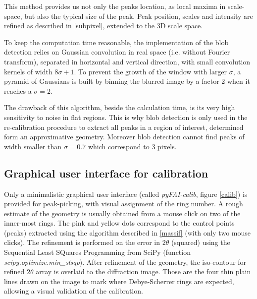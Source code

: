 \documentclass[preprint]{iucr}
\begin{document}
This method provides us not only the peaks location, as local maxima in
scale-space, but also the typical size of the peak.
Peak position, scales and intensity are refined as described in
\ref{subpixel}, extended to the 3D scale space.

To keep the computation time reasonable, the implementation of the blob
detection relies on Gaussian convolution in real space (i.e. without Fourier
transform), separated in horizontal and vertical direction, with small
convolution kernels of width $8 \sigma +1$.
To prevent the growth of the window with larger $\sigma$, a pyramid of Gaussians
is built by binning the blurred image by a factor 2 when it reaches a
$\sigma=2$.

The drawback of this algorithm, beside the calculation time, is its very high
sensitivity to noise in flat regions.
This is why blob detection is only used in the re-calibration procedure to
extract all peaks in a region of interest, determined form an
approximative geometry.
Moreover blob detection cannot find peaks of width smaller than
$\sigma=0.7$ which correspond to 3 pixels.


\subsection{Graphical user interface for calibration}
\label{gui_calib}
Only a minimalistic graphical user interface (called
\textit{pyFAI-calib}, figure \ref{calib}) is provided
for peak-picking, with visual assignment of the ring number.
A rough estimate of the geometry is usually obtained from a mouse click on
two of the inner-most rings.
The pink and yellow dots correspond to the control points (peaks) extracted
using the algorithm described in \ref{massif} (with only two mouse clicks).
The refinement is performed on the error in $2\theta$ (squared) using the
Sequential Least SQuares Programming  from
SciPy (function \textit{scipy.optimize.min\_slsqp}).
After refinement of the geometry, the iso-contour for refined $2\theta$ array is
overlaid to the diffraction image. Those are the four thin plain lines drawn on
the image to mark where Debye-Scherrer rings are expected, allowing a visual
validation of the calibration.
\end{document}
